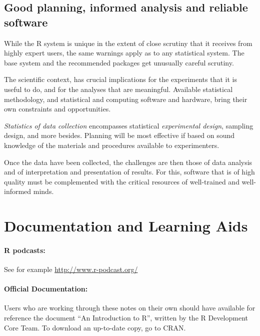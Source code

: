 \subsection*{Good planning,  informed analysis and reliable software}

While the R system
is unique in the extent of close scrutiny that it
receives from highly expert users, the same warnings apply as to any
statistical system.  The base system and the recommended
  packages get unusually careful scrutiny.

  The scientific context, has crucial implications for the experiments
  that it is useful to do, and for the analyses that are meaningful.
  Available statistical methodology, and statistical and computing
  software and hardware, bring their own constraints and opportunities.

\textit{Statistics of data collection}  encompasses statistical
\textit{experimental design}, sampling design, and more besides.
Planning will be most effective if based on sound knowledge of the
materials and procedures available to experimenters.

Once the data have been collected, the challenges are then those of
data analysis and of interpretation and presentation of results. For
this, software that is of high quality must be complemented with the
critical resources of well-trained and well-informed minds.

\section*{Documentation and Learning Aids}
\paragraph{R podcasts:} See for example
\url{http://www.r-podcast.org/}

\paragraph{Official Documentation:}
Users who are working through these notes on their own should
have available for reference the document
``An Introduction to R'', written by the R Development Core Team.
To download an up-to-date copy, go to CRAN.

